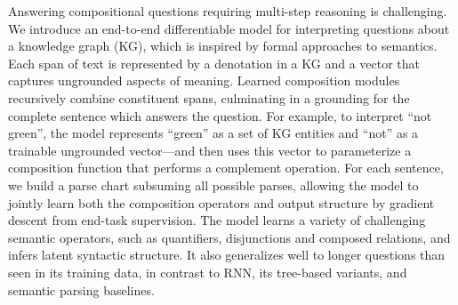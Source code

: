 Answering compositional questions requiring multi-step reasoning is challenging. We introduce an end-to-end differentiable model for interpreting questions about a knowledge graph (KG), which is inspired by formal approaches to semantics. Each span of text is represented by a denotation in a KG and a vector that captures ungrounded aspects of meaning. Learned composition modules recursively combine constituent spans, culminating in a grounding for the complete sentence which answers the question. For example, to interpret ``not green'', the model represents ``green'' as a set of KG entities and ``not'' as a trainable ungrounded vector---and then uses this vector to parameterize a composition function that performs a complement operation. For each sentence, we build a parse chart subsuming all possible parses, allowing the model to jointly learn both the composition operators and output structure by gradient descent from end-task supervision. The model learns a variety of challenging semantic operators, such as quantifiers, disjunctions and composed relations, and infers latent syntactic structure.  It also generalizes well to longer questions than seen in its training data, in contrast to RNN, its tree-based variants, and semantic parsing baselines.
